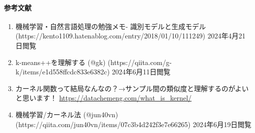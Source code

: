 \documentclass{ltjsarticle}
\begin{document}
\paragraph{参考文献}
\begin{enumerate}
  \item 機械学習・自然言語処理の勉強メモ- 識別モデルと生成モデル (https://kento1109.hatenablog.com/entry/2018/01/10/111249) 2024年4月21日閲覧
  \item k-means++を理解する (@g\-k) (https://qiita.com/g-k/items/e1d558ffcdc833e6382c) 2024年6月11日閲覧
  \item カーネル関数って結局なんなの？→サンプル間の類似度と理解するのがよいと思います！ \url{https://datachemeng.com/what_is_kernel/}
  \item 機械学習/カーネル法 (@jun40vn) (https://qiita.com/jun40vn/items/07c3b4d242f3e7e66265) 2024年6月19日閲覧
\end{enumerate}


\newpage
\end{document}
